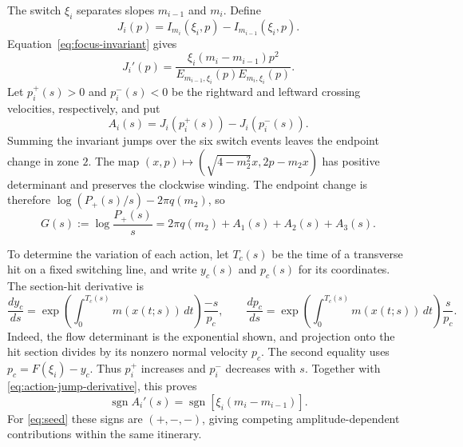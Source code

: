 \documentclass[11pt]{article}
\theoremstyle{remark}
\begin{document}
The switch \(\xi_i\) separates slopes \(m_{i-1}\) and \(m_i\).
Define
\[
                 J_i(p)=I_{m_i}(\xi_i,p)-I_{m_{i-1}}(\xi_i,p).
\]
Equation~\eqref{eq:focus-invariant} gives
\begin{equation}\label{eq:action-jump-derivative}
 J_i'(p)=\frac{\xi_i(m_i-m_{i-1})p^2}
 {E_{m_{i-1},\xi_i}(p)E_{m_i,\xi_i}(p)}.
\end{equation}
Let \(p_i^+(s)>0\) and \(p_i^-(s)<0\) be the rightward and leftward
crossing velocities, respectively, and put
\[
                    A_i(s)=J_i(p_i^+(s))-J_i(p_i^-(s)).
\]
Summing the invariant jumps over the six switch events leaves the
endpoint change in zone \(2\).  The map
\((x,p)\mapsto(\sqrt{4-m_2^2}x,2p-m_2x)\) has positive determinant
and preserves the clockwise winding.  The endpoint change is therefore
\(\log(P_+(s)/s)-2\pi q(m_2)\), so
\begin{equation}\label{eq:action-balance}
 G(s):=\log\frac{P_+(s)}s
      =2\pi q(m_2)+A_1(s)+A_2(s)+A_3(s).
\end{equation}

To determine the variation of each action, let \(T_c(s)\) be the time
of a transverse hit on a fixed switching line, and write \(y_c(s)\)
and \(p_c(s)\) for its coordinates.  The section-hit derivative is
\[
 \frac{dy_c}{ds}
 =\exp\!\left(\int_0^{T_c(s)}m(x(t;s))\,dt\right)\frac{-s}{p_c},
 \qquad
 \frac{dp_c}{ds}
 =\exp\!\left(\int_0^{T_c(s)}m(x(t;s))\,dt\right)\frac{s}{p_c}.
\]
Indeed, the flow determinant is the exponential shown, and projection
onto the hit section divides by its nonzero normal velocity \(p_c\).
The second equality uses \(p_c=F(\xi_i)-y_c\).  Thus \(p_i^+\)
increases and \(p_i^-\) decreases with \(s\).  Together with
\eqref{eq:action-jump-derivative}, this proves
\[
              \operatorname{sgn}A_i'(s)
              =\operatorname{sgn}[\xi_i(m_i-m_{i-1})].
\]
For \eqref{eq:seed} these signs are \((+,-,-)\), giving competing
amplitude-dependent contributions within the same itinerary.
\end{document}
